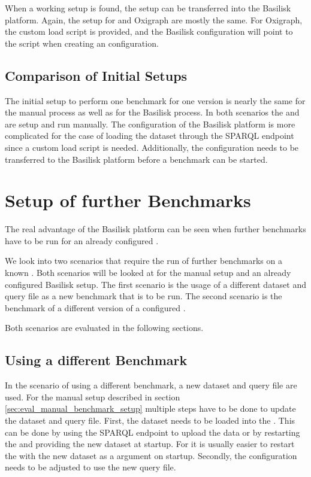 When a working setup is found, the setup can be transferred into the Basilisk platform.
Again, the setup for \tentris{} and Oxigraph are mostly the same.
For Oxigraph, the custom load script is provided, and the Basilisk configuration will point to the script when creating an \iguana{} configuration.



\subsection{Comparison of Initial Setups}
The initial setup to perform one benchmark for one \ts{} version is nearly the same for the manual process as well as for the Basilisk process.
In both scenarios the \ts{} and \iguana{} are setup and run manually.
The configuration of the Basilisk platform is more complicated for the case of loading the dataset through the SPARQL endpoint since a custom load script is needed.
Additionally, the configuration needs to be transferred to the Basilisk platform before a benchmark can be started.


\section{Setup of further Benchmarks}
The real advantage of the Basilisk platform can be seen when further benchmarks have to be run for an already configured \ts{}.

We look into two scenarios that require the run of further benchmarks on a known \ts{}.
Both scenarios will be looked at for the manual setup and an already configured Basilisk setup.
The first scenario is the usage of a different dataset and query file as a new benchmark that is to be run.
The second scenario is the benchmark of a different version of a configured \ts{}.

Both scenarios are evaluated in the following sections.


\subsection{Using a different Benchmark}
In the scenario of using a different benchmark, a new dataset and query file are used.
For the manual setup described in section \ref{sec:eval_manual_benchmark_setup} multiple steps have to be done to update the dataset and query file.
First, the dataset needs to be loaded into the \ts{}.
This can be done by using the SPARQL endpoint to upload the data or by restarting the \ts{} and providing the new dataset at startup.
For \tentris{} it is usually easier to restart the \ts{} with the new dataset as a argument on startup.
Secondly, the \iguana{} configuration needs to be adjusted to use the new query file.
\\

